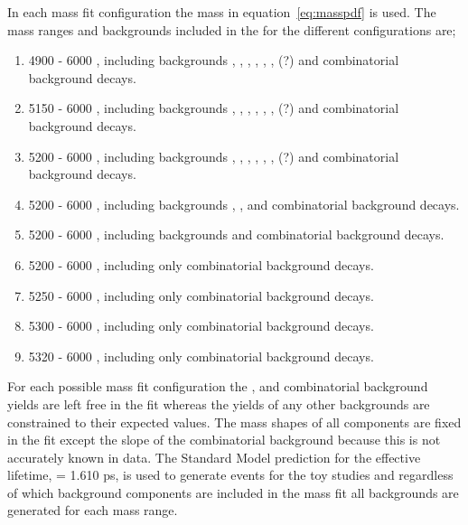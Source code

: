 {%

In each mass fit configuration the mass \pdf in equation~\ref{eq:masspdf} is used. 
The mass ranges and backgrounds included in the \pdf for the different configurations are;
\begin{enumerate}
\item 4900 - 6000 \mevcc, including backgrounds \bdmumu, \bhh, \lambdab, \bdpimunu, \bsKmunu, \bpimumu, \bcjpsimunu (?) and combinatorial background decays.
\item 5150 - 6000 \mevcc, including backgrounds \bdmumu, \bhh, \lambdab, \bdpimunu, \bsKmunu, \bpimumu, \bcjpsimunu (?) and combinatorial background decays.
\item 5200 - 6000 \mevcc, including backgrounds \bdmumu, \bhh, \lambdab, \bdpimunu, \bsKmunu, \bpimumu, \bcjpsimunu (?) and combinatorial background decays.
\item 5200 - 6000 \mevcc, including backgrounds \bdmumu, \bhh, \lambdab and combinatorial background decays.
\item 5200 - 6000 \mevcc, including backgrounds \bdmumu and combinatorial background decays.
\item 5200 - 6000 \mevcc, including only combinatorial background decays.
\item 5250 - 6000 \mevcc, including only combinatorial background decays.
\item 5300 - 6000 \mevcc, including only combinatorial background decays.
\item 5320 - 6000 \mevcc, including only combinatorial background decays.
\end{enumerate}



For each possible mass fit configuration the \bsmumu, \bdmumu and combinatorial background yields are left free in the fit whereas the yields of any other backgrounds are constrained to their expected values. The mass shapes of all components are fixed in the \ml fit except the slope of the combinatorial background because this is not accurately known in data.
The Standard Model prediction for the \bsmumu effective lifetime, \tH = 1.610 ps, is used to generate events for the toy studies and regardless of which background components are included in the mass fit all backgrounds are generated for each mass range. 

}
